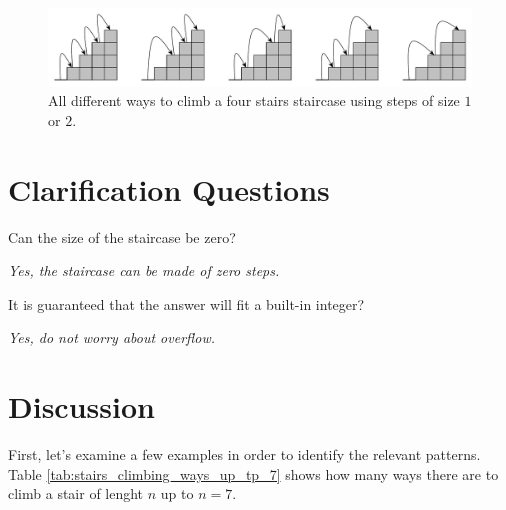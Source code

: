 \begin{figure}
	\centering
	\includegraphics[width=\textwidth]{sources/stairs_climbing/images/stairs4}
	\caption{All different ways to climb a four stairs staircase using steps of size $1$ or $2$.}
	\label{fig:stair_example_5}
\end{figure}

\section{Clarification Questions}

\begin{QandA}
	\begin{questionitem} \begin{question} Can the size of the staircase be zero?  \end{question} 	 
    \begin{answered}
		\textit{Yes, the staircase can be made of zero steps.}
	\end{answered} \end{questionitem}
	
	\begin{questionitem} \begin{question} It is guaranteed that the answer will fit a built-in integer?  \end{question} 	 
    \begin{answered}
		\textit{Yes, do not worry about overflow.}
	\end{answered} \end{questionitem}

\end{QandA}

\section{Discussion}
\label{stairs_climbing:sec:discussion}

First, let's examine a few examples in order to identify the relevant patterns. Table \ref{tab:stairs_climbing_ways_up_tp_7} shows  how many ways there are to climb a stair of lenght $n$ up to $n=7$.

